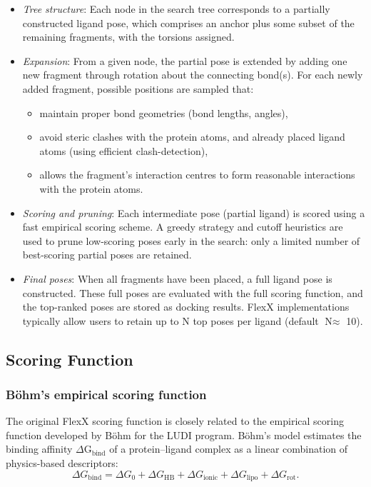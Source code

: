 \documentclass[12pt]{article}
\begin{document}
\begin{itemize}
  \item \emph{Tree structure}: Each node in the search tree corresponds to a partially constructed ligand pose, which comprises an anchor plus some subset of the remaining fragments, with the torsions assigned.

  \item \emph{Expansion}: From a given node, the partial pose is extended by adding one new fragment through rotation about the connecting bond(s). For each newly added fragment, possible positions are sampled that:
        \begin{itemize}
          \item maintain proper bond geometries (bond lengths, angles),
          \item avoid steric clashes with the protein atoms,  and already placed ligand atoms (using efficient clash-detection),
          \item allows the fragment's interaction centres to form reasonable interactions with the protein atoms.
        \end{itemize}

  \item \emph{Scoring and pruning}: Each intermediate pose (partial ligand) is scored using a fast empirical scoring scheme. A greedy strategy and cutoff heuristics are used to prune low-scoring poses early in the search: only a limited number of best-scoring partial poses are retained\cite{CH7_rarey1996,CH7_kramer1999}.

  \item \emph{Final poses}: When all fragments have been placed, a full ligand pose is constructed. These full poses are evaluated with the full scoring function, and the top-ranked poses are stored as docking results. FlexX implementations typically allow users to retain up to N top poses per ligand (default $\textrm{N} \approx$ 10).
\end{itemize}


\subsection{Scoring Function}

\subsubsection{B{\"o}hm's empirical scoring function}

The original FlexX scoring function is closely related to the empirical scoring function developed by B{\"o}hm for the LUDI program\cite{CH7_bohm1994}. B{\"o}hm's model estimates the binding affinity $\Delta \textrm{G}_{\textrm{bind}}$ of a protein--ligand complex as a linear combination of physics-based descriptors:
\begin{equation}
  \Delta G_{\textrm{bind}}
   =
  \Delta G_0
  +
  \Delta G_{\textrm{HB}}
  +
  \Delta G_{\textrm{ionic}}
  +
  \Delta G_{\textrm{lipo}}
  +
  \Delta G_{\textrm{rot}}.
  \label{eq:boehm_general}
\end{equation}
\end{document}
